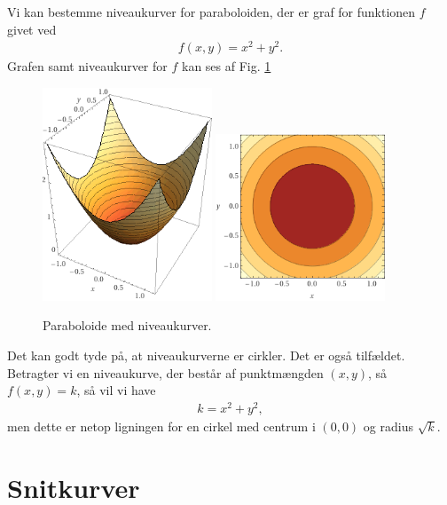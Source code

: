 \begin{exa}
	Vi kan bestemme niveaukurver for paraboloiden, der er graf for funktionen $f$ givet ved
	\begin{align*}
		f(x,y) = x^2+y^2.
	\end{align*} 
	Grafen samt niveaukurver for $f$ kan ses af Fig. \ref{fig:paraboloide}
	\begin{figure}[H]
		\centering
		\includegraphics[width=0.45\textwidth]{Billeder/Paraboloide.png}
		\includegraphics[width=0.45\textwidth]{Billeder/niveauparabol.png}
		\caption{Paraboloide med niveaukurver.}
		\label{fig:paraboloide}
	\end{figure}
	Det kan godt tyde på, at niveaukurverne er cirkler. Det er også tilfældet. Betragter vi en niveaukurve, der består af punktmængden $(x,y)$, så $f(x,y) = k$, så vil vi have
	\begin{align*}
		k = x^2 + y^2,
	\end{align*}
	men dette er netop ligningen for en cirkel med centrum i $(0,0)$ og radius $\sqrt{k}$. 
\end{exa}

\section*{Snitkurver}


